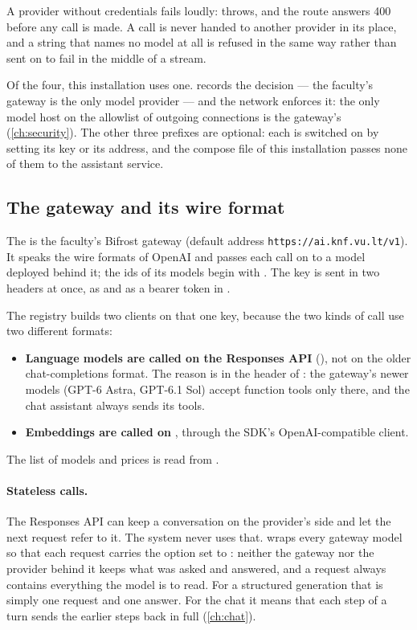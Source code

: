 A provider without credentials fails loudly:  throws, and the route answers
400~ before any call is made. A call is never handed to another provider
in its place, and a string that names no model at all is refused in the same way rather than
sent on to fail in the middle of a stream.

Of the four, this installation uses one.  records the decision ---
the faculty's gateway is the only model provider --- and the network enforces it: the only
model host on the allowlist of outgoing connections is the gateway's (\cref{ch:security}).
The other three prefixes are optional: each is switched on by setting its key or its
address, and the compose file of this installation passes none of them to the assistant
service.

\subsection{The gateway and its wire format}

The  is the faculty's Bifrost gateway (default address
\texttt{https://ai.knf.vu.lt/v1}). It speaks the wire formats of OpenAI and passes each call on
to a model deployed behind it; the ids of its models begin with . The key is sent
in two headers at once, as  and as a bearer token in .

The registry builds two clients on that one key, because the two kinds of call use two
different formats:

\begin{itemize}
  \item \textbf{Language models are called on the Responses API} (), not
    on the older chat-completions format. The reason is in the header of
    : the gateway's newer models (GPT-6 Astra, GPT-6.1 Sol) accept
    function tools only there, and the chat assistant always sends its tools.
  \item \textbf{Embeddings are called on} , through the SDK's
    OpenAI-compatible client.
\end{itemize}

The list of models and prices is read from .

\paragraph{Stateless calls.} The Responses API can keep a conversation on the provider's
side and let the next request refer to it. The system never uses that.
 wraps every gateway model so that each request carries the option
 set to : neither the gateway nor the provider behind it keeps what
was asked and answered, and a request always contains everything the model is to read. For a
structured generation that is simply one request and one answer. For the chat it means that
each step of a turn sends the earlier steps back in full (\cref{ch:chat}).

